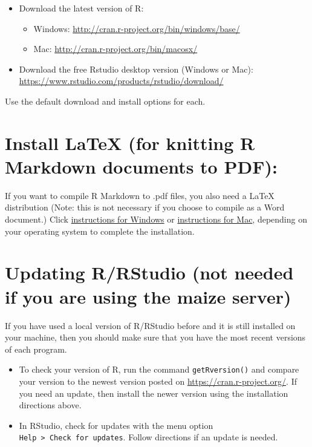 \documentclass[
]{book}
\providecommand{\tightlist}{%
  \setlength{\itemsep}{0pt}\setlength{\parskip}{0pt}}
\begin{document}
\begin{itemize}
\tightlist
\item
  Download the latest version of R:

  \begin{itemize}
  \tightlist
  \item
    Windows: \url{http://cran.r-project.org/bin/windows/base/}
  \item
    Mac: \url{http://cran.r-project.org/bin/macosx/}
  \end{itemize}
\item
  Download the free Rstudio desktop version (Windows or Mac): \url{https://www.rstudio.com/products/rstudio/download/}
\end{itemize}

Use the default download and install options for each.

\hypertarget{install-latex-for-knitting-r-markdown-documents-to-pdf}{%
\section{Install LaTeX (for knitting R Markdown documents to PDF):}\label{install-latex-for-knitting-r-markdown-documents-to-pdf}}

If you want to compile R Markdown to .pdf files, you also need a LaTeX distribution (Note: this is not necessary if you choose to compile as a Word document.) Click \href{http://www.miktex.org/}{instructions for Windows} or \href{https://tug.org/mactex/}{instructions for Mac}, depending on your operating system to complete the installation.

\hypertarget{updating-rrstudio-not-needed-if-you-are-using-the-maize-server}{%
\section{Updating R/RStudio (not needed if you are using the maize server)}\label{updating-rrstudio-not-needed-if-you-are-using-the-maize-server}}

If you have used a local version of R/RStudio before and it is still installed on your machine, then you should make sure that you have the most recent versions of each program.

\begin{itemize}
\item
  To check your version of R, run the command \texttt{getRversion()} and compare your version to the newest version posted on \url{https://cran.r-project.org/}. If you need an update, then install the newer version using the installation directions above.
\item
  In RStudio, check for updates with the menu option \texttt{Help\ \textgreater{}\ Check\ for\ updates}. Follow directions if an update is needed.
\end{itemize}
\end{document}
